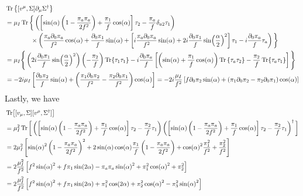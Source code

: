 \documentclass{article}
\begin{document}
\begin{align*}
    & \Tr\left\{[v^\mu, \Sigma] \partial_\mu \Sigma^\dagger\right\}\\
    & = \mu_I \Tr\bigg\{
        \left(
        \left[
            \sin(\alpha)\left(1 - \frac{\pi_a \pi_a}{2f^2}\right)
            + \frac{\pi_1}{f} \cos(\alpha)
        \right]\tau_2
        -\frac{\pi_a}{f}\delta_{a2}\tau_1
        \right) \\
    & \phantom{= \mu_I \Tr\bigg[ }
        \times 
        \left(
            \frac{\pi_a\partial_0 \pi_a}{f^2} \cos(\alpha) 
            + \frac{\partial_0 \pi_1}{f} \sin(\alpha)
            + \left[
                i\frac{\pi_a\partial_0 \pi_a}{f^2}\sin(\alpha)
                + 2 i \frac{\partial_0 \pi_1}{f}\sin(\frac{\alpha}{2})^2
            \right] \tau_1
            - i\frac{\partial_0 \pi_a }{f} \tau_a
        \right)
        \bigg\} \\
    &= \mu_I\Bigg\{
        \left( 2 i \frac{\partial_0 \pi_1}{f}\sin(\frac{\alpha}{2})^2 \right)
        \left( -\frac{\pi_2}{f}\right) \Tr\{\tau_1\tau_1\}
        - i\frac{\partial_0 \pi_a }{f}
        \left[
            \left(
                \sin(\alpha)
                + \frac{\pi_1}{f}\cos(\alpha)
            \right) \Tr\left\{ \tau_a\tau_2 \right\}
            -\frac{\pi_2}{f}\Tr\{\tau_a\tau_1\}
        \right]
        \Bigg\} \\
    & =-2i\mu_I \left[
        \frac{\partial_0 \pi_2}{f}\sin(\alpha) 
        + 
        \left(
            \frac{\pi_1 \partial_0 \pi_2}{f^2} 
            - \frac{\pi_2 \partial_0 \pi_1}{f^2}
        \right)
        \cos(\alpha)
    \right] 
    = -2i\frac{\mu_I}{f^2}
    \left[ 
        f \partial_0 \pi_2 \sin(\alpha) 
        + (\pi_1\partial_0\pi_2 
        - \pi_2\partial_0\pi_1)\cos(\alpha)
        \right]
\end{align*}
Lastly, we have
\begin{align*}
    & \Tr[ [v_\mu, \Sigma][v^\mu, \Sigma^\dagger]] \\
    & = \mu_I^2 \Tr \bigg[ 
    \left(
        \left[
            \sin(\alpha)\left(1 - \frac{\pi_a \pi_a}{2f^2}\right)
            + \frac{\pi_1}{f}\cos(\alpha)
       \right]\tau_2
        -\frac{\pi_2}{f}\tau_1
    \right)
    \left(
        \left[
            \sin(\alpha)\left(1 - \frac{\pi_a \pi_a}{2f^2}\right)
            + \frac{\pi_1}{f}\cos(\alpha)
        \right]\tau_2
        -\frac{\pi_2}{f}\tau_1
    \right)^\dagger
    \bigg]\\
    & = 2 \mu_I^2 \left[
        \sin(\alpha)^2 \left(1 - \frac{\pi_a \pi_a}{2f^2}\right)^2
        +2\sin(\alpha)\cos(\alpha)\frac{\pi_1}{f}\left(1 - \frac{\pi_a \pi_a}{2f^2}\right)
        +\cos(\alpha)^2 \frac{\pi_1^2}{f^2} + \frac{\pi_2^2}{f^2}
    \right] \\
    & = 2 \frac{\mu_I^2}{f^2} 
    \left[
        f^2\sin(\alpha)^2
        + f \pi_1 \sin(2 \alpha)
        -  \pi_a\pi_a \sin(\alpha)^2
        + \pi_1^2\cos(\alpha)^2 
        + \pi_2^2
    \right] \\
    & = 2 \frac{\mu_I^2}{f^2} \left[
        f^2\sin(\alpha)^2
        + f \pi_1 \sin(2 \alpha)
        + \pi_1^2 \cos(2\alpha)
        + \pi_2^2 \cos(\alpha)^2
        - \pi_3^2 \sin(\alpha)^2
    \right]
\end{align*}
\end{document}
